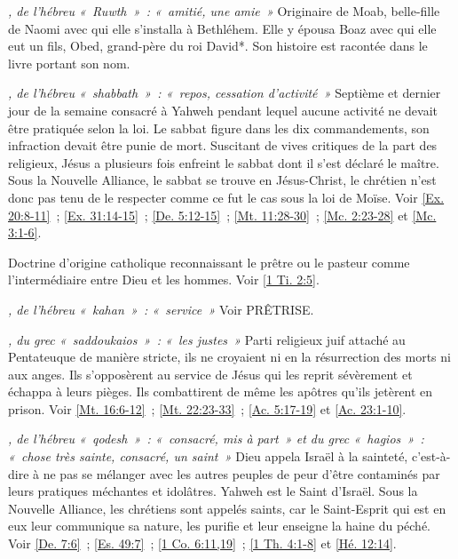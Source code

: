 \begin{multicols}{2}
\textit{, de l'hébreu «~Ruwth~»~: «~amitié, une amie~»}\newline
Originaire de Moab, belle-fille de Naomi avec qui elle s'installa à Bethléhem. Elle y épousa Boaz avec qui elle eut un fils, Obed, grand-père du roi David*. Son histoire est racontée dans le livre portant son nom.

\textit{, de l'hébreu «~shabbath~»~: «~repos, cessation d'activité~»}\newline
Septième et dernier jour de la semaine consacré à Yahweh pendant lequel aucune activité ne devait être pratiquée selon la loi. Le sabbat figure dans les dix commandements, son infraction devait être punie de mort. Suscitant de vives critiques de la part des religieux, Jésus a plusieurs fois enfreint le sabbat dont il s'est déclaré le maître. Sous la Nouvelle Alliance, le sabbat se trouve en Jésus-Christ, le chrétien n'est donc pas tenu de le respecter comme ce fut le cas sous la loi de Moïse. Voir \vref{Ex. 20:8-11}~; \vref{Ex. 31:14-15}~; \vref{De. 5:12-15}~; \vref{Mt. 11:28-30}~; \vref{Mc. 2:23-28} et \vref{Mc. 3:1-6}.

\textit{}\newline
Doctrine d'origine catholique reconnaissant le prêtre ou le pasteur comme l'intermédiaire entre Dieu et les hommes. Voir \vref{1 Ti. 2:5}.

\textit{, de l'hébreu «~kahan~»~: «~service~»}\newline
Voir PRÊTRISE.

\textit{, du grec «~saddoukaios~»~: «~les justes~»}\newline
Parti religieux juif attaché au Pentateuque de manière stricte, ils ne croyaient ni en la résurrection des morts ni aux anges. Ils s'opposèrent au service de Jésus qui les reprit sévèrement et échappa à leurs pièges. Ils combattirent de même les apôtres qu'ils jetèrent en prison. Voir \vref{Mt. 16:6-12}~; \vref{Mt. 22:23-33}~; \vref{Ac. 5:17-19} et \vref{Ac. 23:1-10}.

\textit{, de l'hébreu «~qodesh~»~: «~consacré, mis à part~» et du grec «~hagios~»~: «~chose très sainte, consacré, un saint~»}\newline
Dieu appela Israël à la sainteté, c'est-à-dire à ne pas se mélanger avec les autres peuples de peur d'être contaminés par leurs pratiques méchantes et idolâtres. Yahweh est le Saint d'Israël. Sous la Nouvelle Alliance, les chrétiens sont appelés saints, car le Saint-Esprit qui est en eux leur communique sa nature, les purifie et leur enseigne la haine du péché. Voir \vref{De. 7:6}~; \vref{Es. 49:7}~; \vref{1 Co. 6:11,19}~; \vref{1 Th. 4:1-8} et \vref{Hé. 12:14}.


\end{multicols}
